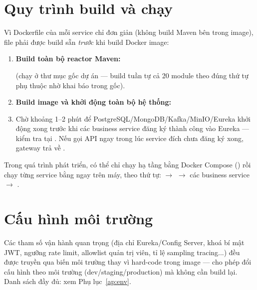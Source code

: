 \documentclass[12pt,a4paper]{report}
\begin{document}
\section{Quy trình build và chạy}

Vì Dockerfile của mỗi service chỉ đơn giản 
(không build Maven bên trong image), file  phải được build sẵn
\emph{trước} khi build Docker image:

\begin{enumerate}[nosep]
    \item \textbf{Build toàn bộ reactor Maven:}
    \begin{quote}\end{quote}
    (chạy ở thư mục gốc dự án — build tuần tự cả 20 module theo đúng thứ tự
    phụ thuộc nhờ  khai báo trong  gốc).
    \item \textbf{Build image và khởi động toàn bộ hệ thống:}
    \begin{quote}\end{quote}
    \item Chờ khoảng 1--2 phút để PostgreSQL/MongoDB/Kafka/MinIO/Eureka khởi
    động xong trước khi các business service đăng ký thành công vào Eureka —
    kiểm tra tại . Nếu gọi API ngay trong lúc
    service đích chưa đăng ký xong, gateway trả về .
\end{enumerate}

Trong quá trình phát triển, có thể chỉ chạy hạ tầng bằng Docker Compose
() rồi chạy
từng service bằng  ngay trên máy, theo thứ tự:
 $\to$  $\to$ các business service
$\to$ .

\section{Cấu hình môi trường}

Các tham số vận hành quan trọng (địa chỉ Eureka/Config Server, khoá bí mật
JWT, ngưỡng rate limit, allowlist quản trị viên, tỉ lệ sampling tracing...)
đều được truyền qua biến môi trường thay vì hard-code trong image — cho phép
đổi cấu hình theo môi trường (dev/staging/production) mà không cần build lại.
Danh sách đầy đủ: xem Phụ lục~\ref{ap:env}.

\end{document}

